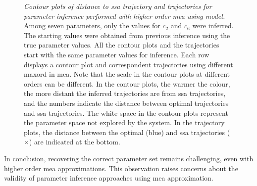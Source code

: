\begin{figure}
\caption{\emph{Contour plots of distance to \gls{ssa} trajectory and trajectories for parameter inference performed with higher order \gls{mea} using \pft{} model.}  
    Among seven parameters, only the values for $c_2$ and $c_6$ were inferred. The starting values were obtained from previous inference using the true parameter values.
    All the contour plots and the trajectories start with the same parameter values for inference.
    Each row displays a contour plot and correspondent trajectories using different \gls{maxord} in \gls{mea}.
    Note that the scale in the contour plots at different orders can be different.
    In the contour plots, the warmer the colour, the more distant the inferred trajectories are from \gls{ssa} trajectories, and the numbers indicate the distance between optimal trajectories and \gls{ssa} trajectories.
    The white space in the contour plots represent the parameter space not explored by the system. 
    In the trajectory plots, the distance between the optimal (blue) and \gls{ssa} trajectories ($\times$) are indicated at the bottom.}
\label{fig:inference_phenomenon:higher_order}
\end{figure}


In conclusion, recovering the correct parameter set remains challenging, even with higher order \gls{mea} approximations. This observation raises concerns about the validity of parameter inference approaches using \gls{mea} approximation. 

